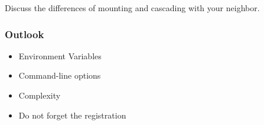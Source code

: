 \begin{assignment}
	\begin{task}
	Discuss the differences of mounting and cascading with your neighbor.
	\end{task}
\end{assignment}

\begin{frame}
	\frametitle{Outlook}
	\begin{itemize}
	\item Environment Variables
	\item Command-line options
	\item Complexity
	\item Do not forget the registration
	\end{itemize}
\end{frame}




\nocite{raab2017introducing}

\appendix

\begin{frame}[allowframebreaks]
	
	
\end{frame}




